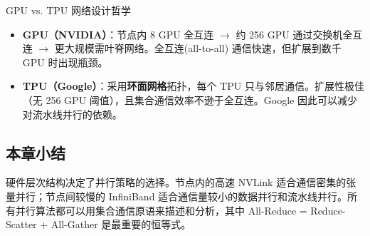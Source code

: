\begin{knowledgebox}{GPU vs. TPU 网络设计哲学}
\begin{itemize}
    \item \textbf{GPU（NVIDIA）}：节点内 8 GPU 全互连 $\rightarrow$ 约 256 GPU 通过交换机全互连 $\rightarrow$ 更大规模需叶脊网络。全互连(all-to-all) 通信快速，但扩展到数千 GPU 时出现瓶颈。
    \item \textbf{TPU（Google）}：采用\textbf{环面网格}拓扑，每个 TPU 只与邻居通信。扩展性极佳（无 256 GPU 阈值），且集合通信效率不逊于全互连。Google 因此可以减少对流水线并行的依赖。
\end{itemize}
\end{knowledgebox}

\subsection{本章小结}

硬件层次结构决定了并行策略的选择。节点内的高速 NVLink 适合通信密集的张量并行；节点间较慢的 InfiniBand 适合通信量较小的数据并行和流水线并行。所有并行算法都可以用集合通信原语来描述和分析，其中 All-Reduce = Reduce-Scatter + All-Gather 是最重要的恒等式。


